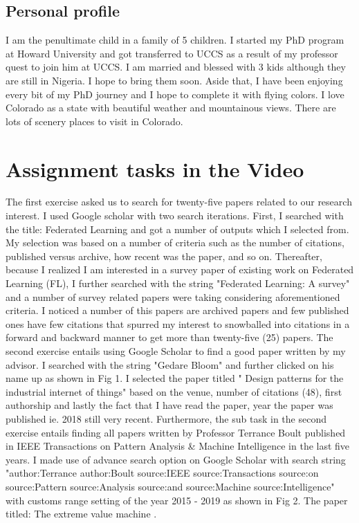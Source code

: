 \subsection{Personal profile}
I am the penultimate child in a family of 5 children. I started my PhD program at Howard University and got transferred to UCCS as a result of my professor quest to join him at UCCS. I am married and blessed with 3 kids although they are still  in Nigeria. I hope to bring them soon. Aside that, I have been enjoying every bit of my PhD journey and I hope to complete it with flying colors. I love Colorado as a state with beautiful weather and mountainous views. There are lots of scenery places to visit in Colorado.


\section{Assignment tasks in the Video}
The first exercise asked us to search for twenty-five papers related to our research interest. I used Google scholar with two search iterations. First, I searched with the title: Federated Learning and got a number of outputs which I selected from. My selection was based on a number of criteria such as the number of citations, published versus archive, how recent was the paper, and so on. Thereafter, because I realized I am interested in a survey paper of existing work on Federated Learning (FL), I further searched with the string "Federated Learning: A survey" and a number of survey related papers were taking considering aforementioned criteria. I noticed a number of this papers are archived papers and few published ones have few citations that spurred my interest to snowballed into citations in a forward and backward manner to get more than twenty-five (25) papers. 
The second exercise entails using Google Scholar to find a good paper written by my advisor. I searched with the string "Gedare Bloom" and further clicked on his name up as shown in Fig 1. I selected the paper titled " Design patterns for the industrial internet of things"  based on the venue, number of citations (48), first authorship and lastly the fact that I have read the paper, year the paper was published ie. 2018 still very recent\cite{b2}. 
Furthermore, the sub task in the second exercise entails finding all papers written by Professor Terrance Boult published in IEEE Transactions on Pattern Analysis & Machine Intelligence in the last five years. I made use of advance search option on Google Scholar with search string "author:Terrance author:Boult source:IEEE source:Transactions source:on source:Pattern source:Analysis source:and source:Machine source:Intelligence" with customs range setting of the year 2015 - 2019 as shown in Fig 2. The paper titled: The extreme value machine \cite{b1}.



